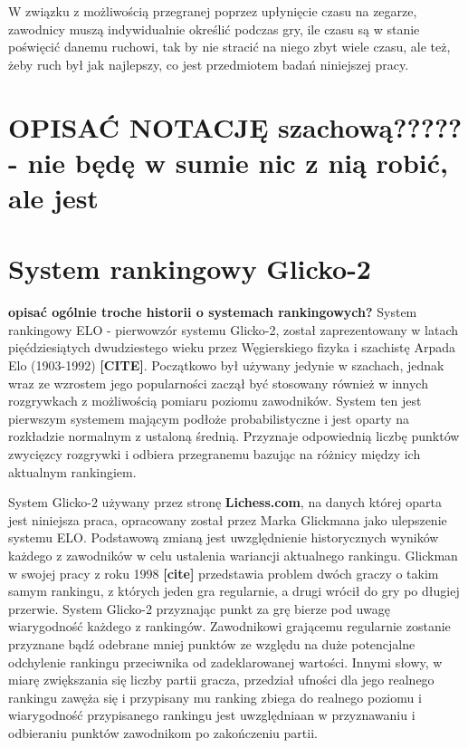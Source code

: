 \documentclass[inzynierska]{pwr_wmat_praca_dyplomowa}
\theoremstyle{plain}
\numberwithin{theorem}{chapter}
\theoremstyle{definition}
\numberwithin{theorem}{chapter}
\begin{document}
W związku z możliwością przegranej poprzez upłynięcie czasu na zegarze, zawodnicy muszą indywidualnie określić podczas gry, ile czasu są w stanie poświęcić danemu ruchowi, tak by nie stracić na niego zbyt wiele czasu, ale też, żeby ruch był jak najlepszy, co jest przedmiotem badań niniejszej pracy.

\section{OPISAĆ NOTACJĘ szachową????? - nie będę w sumie nic z nią robić, ale jest}

\section{System rankingowy Glicko-2}
\textbf{opisać ogólnie troche historii o systemach rankingowych?}
System rankingowy ELO - pierwowzór systemu Glicko-2, został zaprezentowany w latach pięćdziesiątych dwudziestego wieku przez Węgierskiego fizyka i szachistę Arpada Elo (1903-1992) \textbf{[CITE]}. Początkowo był używany jedynie w szachach, jednak wraz ze wzrostem jego popularności zaczął być stosowany również w innych rozgrywkach z możliwością pomiaru poziomu zawodników. System ten jest pierwszym systemem mającym podłoże probabilistyczne i jest oparty na rozkładzie normalnym z ustaloną średnią. Przyznaje odpowiednią liczbę punktów zwycięzcy rozgrywki i odbiera przegranemu bazując na różnicy między ich aktualnym rankingiem.


System Glicko-2 używany przez stronę \textbf{Lichess.com}, na danych której oparta jest niniejsza praca, opracowany został przez Marka Glickmana jako ulepszenie systemu ELO. Podstawową zmianą jest uwzględnienie historycznych wyników każdego z zawodników w celu ustalenia wariancji aktualnego rankingu. Glickman w swojej pracy z roku 1998 \textbf{[cite]} przedstawia problem dwóch graczy o takim samym rankingu, z których jeden gra regularnie, a drugi wrócił do gry po długiej przerwie. System Glicko-2 przyznając punkt za grę bierze pod uwagę wiarygodność każdego z rankingów. Zawodnikowi grającemu regularnie zostanie przyznane bądź odebrane mniej punktów ze względu na duże potencjalne odchylenie rankingu przeciwnika od zadeklarowanej wartości. Innymi słowy, w miarę zwiększania się liczby partii gracza, przedział ufności dla jego realnego rankingu zawęża się i przypisany mu ranking zbiega do realnego poziomu i wiarygodność przypisanego rankingu jest uwzględniaan w przyznawaniu i odbieraniu punktów zawodnikom po zakończeniu partii.
\end{document}
